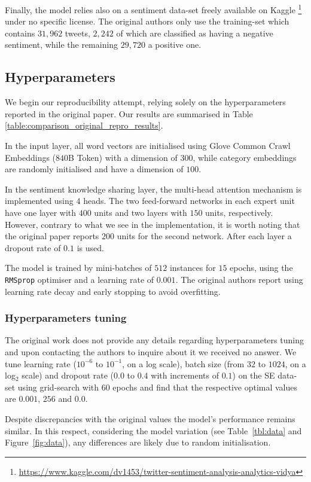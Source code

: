 Finally, the model relies also on a sentiment data-set freely available on Kaggle%
\footnote{\url{https://www.kaggle.com/dv1453/twitter-sentiment-analysis-analytics-vidya}} under no specific license. The original authors only use the training-set which contains $31,962$ tweets, $2,242$ of which are classified as having a negative sentiment, while the remaining $29,720$ a positive one.


\subsection{Hyperparameters}
We begin our reproducibility attempt, relying solely on the hyperparameters reported in the original paper. Our results are summarised in Table \ref{table:comparison_original_repro_results}.

In the input layer, all word vectors are initialised using Glove Common Crawl Embeddings ($840$B Token) with a dimension of $300$, while category embeddings are randomly initialised and have a dimension of $100$.

In the sentiment knowledge sharing layer, the multi-head attention mechanism is implemented using $4$ heads. The two feed-forward networks in each expert unit have one layer with $400$ units and two layers with $150$ units, respectively. However, contrary to what we see in the implementation, it is worth noting that the original paper reports $200$ units for the second network. After each layer a dropout rate of $0.1$ is used.

The model is trained by mini-batches of $512$ instances for $15$ epochs, using the \texttt{RMSprop} optimiser and a learning rate of $0.001$. The original authors report using learning rate decay and early stopping to avoid overfitting.


\subsubsection{Hyperparameters tuning}
The original work does not provide any details regarding hyperparameters tuning and upon contacting the authors to inquire about it we received no answer. We tune learning rate ($10^{-6}$ to $10^{-1}$, on a log scale), batch size (from $32$ to $1024$, on a log$_2$ scale) and dropout rate ($0.0$ to $0.4$ with increments of $0.1$) on the SE data-set using grid-search with $60$ epochs and find that the respective optimal values are $0.001$, $256$ and $0.0$.

Despite discrepancies with the original values the model's performance remains similar. In this respect, considering the model variation (see Table~\ref{tbl:data} and Figure~\ref{fig:data}), any differences are likely due to random initialisation.


